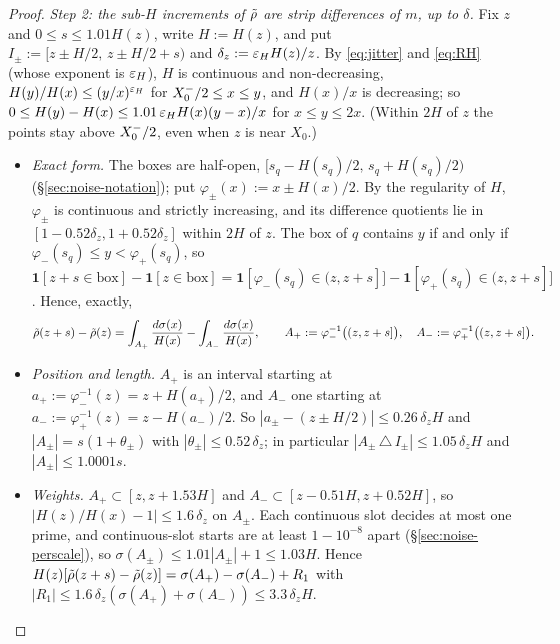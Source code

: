 \begin{proof}
\emph{Step 2: the sub-$H$ increments of $\tilde\rho$ are strip differences of $m$, up to $\delta$.}
Fix $z$ and $0\le s\le1.01H(z)$, write $H:=H(z)$, and put $I_\pm:=[z\pm H/2,\,z\pm H/2+s)$ and $\delta_z:=\varepsilon_HH(z)/z$. By
\eqref{eq:jitter} and \eqref{eq:RH} (whose exponent is $\varepsilon_H$), $H$ is continuous and non-decreasing,
$H(y)/H(x)\le(y/x)^{\varepsilon_H}$ for $X_0^{-}/2\le x\le y$, and $H(x)/x$ is decreasing; so $0\le H(y)-H(x)\le1.01\,\varepsilon_HH(x)(y-x)/x$
for $x\le y\le2x$. (Within $2H$ of $z$ the points stay above $X_0^{-}/2$, even when $z$ is near $X_0$.)
\begin{itemize}
\item \emph{Exact form.} The boxes are half-open, $[s_q-H(s_q)/2,\,s_q+H(s_q)/2)$ (\S\ref{sec:noise-notation}); put
  $\varphi_\pm(x):=x\pm H(x)/2$. By the
  regularity of $H$, $\varphi_\pm$ is continuous and strictly increasing, and its difference quotients lie in
  $[1-0.52\delta_z,1+0.52\delta_z]$ within $2H$ of $z$. The box of $q$ contains $y$ if and only if
  $\varphi_-(s_q)\le y<\varphi_+(s_q)$, so $\mathbf 1[z+s\in\text{box}]-\mathbf 1[z\in\text{box}]
  =\mathbf 1[\varphi_-(s_q)\in(z,z+s]]-\mathbf 1[\varphi_+(s_q)\in(z,z+s]]$. Hence, exactly,
  \[
    \tilde\rho(z+s)-\tilde\rho(z)=\int_{A_+}\frac{d\sigma(x)}{H(x)}-\int_{A_-}\frac{d\sigma(x)}{H(x)},\qquad
    A_+:=\varphi_-^{-1}\big((z,z+s]\big),\quad A_-:=\varphi_+^{-1}\big((z,z+s]\big).
  \]
\item \emph{Position and length.} $A_+$ is an interval starting at $a_+:=\varphi_-^{-1}(z)=z+H(a_+)/2$, and $A_-$ one
  starting at $a_-:=\varphi_+^{-1}(z)=z-H(a_-)/2$. So $|a_\pm-(z\pm H/2)|\le0.26\,\delta_zH$ and $|A_\pm|=s(1+\theta_\pm)$ with
  $|\theta_\pm|\le0.52\,\delta_z$; in particular $|A_\pm\,\triangle\,I_\pm|\le1.05\,\delta_zH$ and $|A_\pm|\le1.0001s$.
\item \emph{Weights.} $A_+\subset[z,z+1.53H]$ and $A_-\subset[z-0.51H,z+0.52H]$, so $|H(z)/H(x)-1|\le1.6\,\delta_z$ on
  $A_\pm$. Each continuous slot decides at most one prime, and continuous-slot starts are at least $1-10^{-8}$ apart
  (\S\ref{sec:noise-perscale}), so $\sigma(A_\pm)\le1.01|A_\pm|+1\le1.03H$. Hence
  $H(z)[\tilde\rho(z+s)-\tilde\rho(z)]=\sigma(A_+)-\sigma(A_-)+R_1$ with $|R_1|\le1.6\,\delta_z(\sigma(A_+)+\sigma(A_-))\le3.3\,\delta_zH$.

\end{itemize}
\end{proof}

